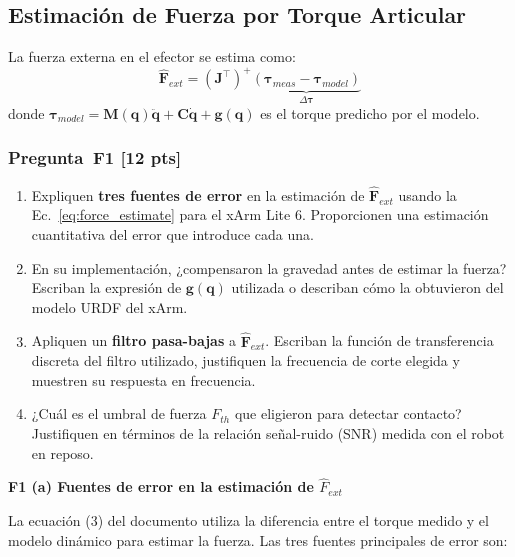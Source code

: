 \documentclass[journal,10pt,twoside]{IEEEtran}
\newcommand{\pts}[1]{\textbf{\color{tec_red}[#1 pts]}}
\begin{document}
\subsection{Estimación de Fuerza por Torque Articular}

La fuerza externa en el efector se estima como:
\begin{equation}
  \hat{\bm{F}}_{ext} = \left(\bm{J}^\top\right)^+
    \underbrace{\left(\bm{\tau}_{meas} - \bm{\tau}_{model}\right)}_{\Delta\bm{\tau}}
  \label{eq:force_estimate}
\end{equation}
donde $\bm{\tau}_{model} = \bm{M}(\bm{q})\ddot{\bm{q}} +
\bm{C}\dot{\bm{q}} + \bm{g}(\bm{q})$ es el torque predicho por el modelo.

\subsubsection*{Pregunta~F1 \pts{12}}
\begin{enumerate}[label=(\alph*)]
  \item Expliquen \textbf{tres fuentes de error} en la estimación de
        $\hat{\bm{F}}_{ext}$ usando la Ec.~\eqref{eq:force_estimate}
        para el xArm Lite 6. Proporcionen una estimación cuantitativa
        del error que introduce cada una.
  \item En su implementación, ¿compensaron la gravedad antes de estimar
        la fuerza? Escriban la expresión de $\bm{g}(\bm{q})$ utilizada
        o describan cómo la obtuvieron del modelo URDF del xArm.
  \item Apliquen un \textbf{filtro pasa-bajas} a $\hat{\bm{F}}_{ext}$.
        Escriban la función de transferencia discreta del filtro
        utilizado, justifiquen la frecuencia de corte elegida
        y muestren su respuesta en frecuencia.
  \item ¿Cuál es el umbral de fuerza $F_{th}$ que eligieron para
        detectar contacto? Justifiquen en términos de la relación
        señal-ruido (SNR) medida con el robot en reposo.
\end{enumerate}

\textbf{F1 (a) Fuentes de error en la estimación de $\hat{F}_{ext}$}

La ecuación (3) del documento utiliza la diferencia entre el torque medido y el modelo dinámico para estimar la fuerza. Las tres fuentes principales de error son:
\end{document}
